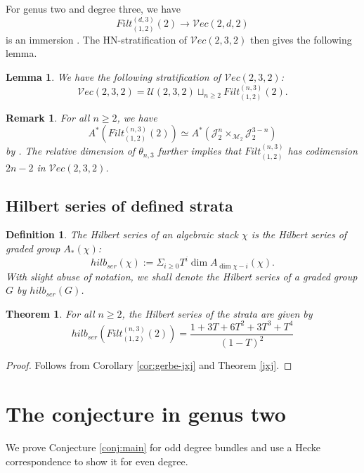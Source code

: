 \documentclass[11pt]{amsart}
\newtheorem{theorem}{Theorem}
\newtheorem{definition}{Definition}[section]
\numberwithin{theorem}{section}
\newtheorem{rem}{Remark}
\newtheorem{lemma}{Lemma}
\numberwithin{lemma}{section}
\theoremstyle{definition}
\newcommand{\ri}{\rightarrow}
\newcommand{\J}{\mathscr{J}}
\newcommand{\U}{\mathscr{U}}
\newcommand{\ve}{\mathcal{V}ec}
\newcommand{\ext}{Filt}
\begin{document}
For genus two and degree three, we have   
$$\ext^{(d,3)}_{(1,2)}(2)\ri \ve(2,d,2)$$ is an immersion \cite[Proposition 5.3]{heinloth}.
The HN-stratification of $\ve(2,3,2)$ then gives the following lemma. 
\begin{lemma}\label{lem:strata}
We have the following stratification of $\ve(2,3,2)$:
$$\ve(2,3,2) = \U(2,3,2) \sqcup_{n\geq 2} \ext^{(n,3)}_{(1,2)}(2).$$
\end{lemma}
\begin{rem}\label{rem:strata}
For all $n\geq 2$, we have $$A^*(\ext^{(n,3)}_{(1,2)}(2))\simeq A^*(\J^n_2\times_{\mathcal{M}_2}\J^{3-n}_2)$$
by \cite[Lemma 3.3]{prada}. The relative dimension of $\theta_{n,3}$ further implies that $\ext^{(n,3)}_{(1,2)}$ has codimension $2n-2$ in $\ve(2,3,2)$. 
\end{rem}
\subsection{Hilbert series of defined strata}\label{sec:hilb-series}
\begin{definition}
The Hilbert series of an algebraic stack $\chi$ is the Hilbert series of graded group 
$A_*(\chi)$:
$$hilb_{ser}(\chi):=\Sigma_{i\geq 0} T^i\dim A_{\dim \chi - i}(\chi).$$ With slight abuse of notation, we shall denote the Hilbert series of a graded group $G$ by $hilb_{ser}(G)$.
\end{definition}
\begin{theorem}\label{thm:hilb-strata}
	For all $n\geq 2$, the Hilbert series of the strata are given by
	$$hilb_{ser}(\ext^{(n,3)}_{(1,2)}(2)) = \dfrac{1+3T+6T^2+3T^3+T^4}{(1-T)^2}$$
\end{theorem}
\begin{proof}
Follows from Corollary \ref{cor:gerbe-jxj} and Theorem \ref{jxj}.	
\end{proof}
\section{The conjecture in genus two}
We prove Conjecture \ref{conj:main} for odd degree bundles and use a Hecke correspondence to show it for even degree.
\end{document}
